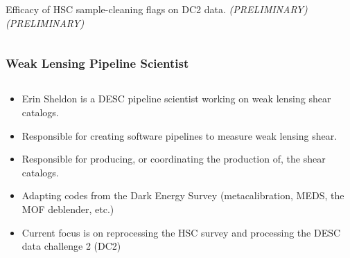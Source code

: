\documentclass[aspectratio=169]{beamer}
\begin{document}
\begin{frame}
\begin{columns}
\begin{column}{3.5cm}
      \begin{center}
\scriptsize
Efficacy of HSC sample-cleaning flags on DC2 data. \textit{(PRELIMINARY)}
        \textit{(PRELIMINARY)}
      \end{center}
      \end{column}



  \end{columns}



\end{frame}


\frame
{

    \frametitle{Weak Lensing Pipeline Scientist}

    \begin{columns}
        \begin{column}{0.7\textwidth}


            \begin{itemize}

                \item Erin Sheldon is a DESC 
                    pipeline scientist working on weak lensing
                    shear catalogs.

                \item Responsible for creating software 
                    pipelines to measure weak lensing shear.

                \item Responsible for producing, or coordinating
                    the production of, the shear catalogs.

                \item Adapting codes from the Dark
                    Energy Survey (metacalibration, MEDS,
                    the MOF deblender, etc.)

                \item Current focus is on reprocessing the HSC survey
                    and processing the DESC data challenge 2 (DC2)

            \end{itemize}


        \end{column}


\end{columns}}
\end{document}
